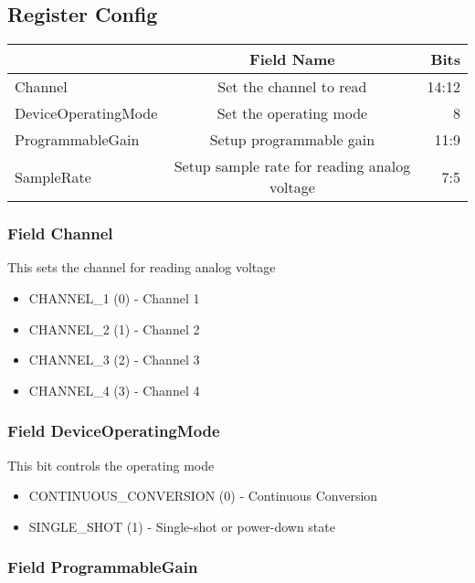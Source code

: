 \documentclass[a4paper,12pt,oneside,pdflatex,italian,final,twocolumn]{article}
\begin{document}
\raggedright

\subsection{Register Config}
\centering
\begin{tabular}{lcr}
\toprule
  & Field Name & Bits \\
\midrule
Channel & Set the channel to read &
14:12
\\
DeviceOperatingMode & Set the operating mode &
8
\\
ProgrammableGain & Setup programmable gain &
11:9
\\
SampleRate & Setup sample rate for reading analog voltage &
7:5
\\
\bottomrule

\end{tabular}


\raggedright

\subsubsection{Field Channel }

This sets the channel for reading analog voltage


\begin{itemize}
\item CHANNEL\_1 (0) - Channel 1
\item CHANNEL\_2 (1) - Channel 2
\item CHANNEL\_3 (2) - Channel 3
\item CHANNEL\_4 (3) - Channel 4
\end{itemize}


\raggedright

\subsubsection{Field DeviceOperatingMode }

This bit controls the operating mode


\begin{itemize}
\item CONTINUOUS\_CONVERSION (0) - Continuous Conversion
\item SINGLE\_SHOT (1) - Single-shot or power-down state
\end{itemize}


\raggedright

\subsubsection{Field ProgrammableGain }
\end{document}
